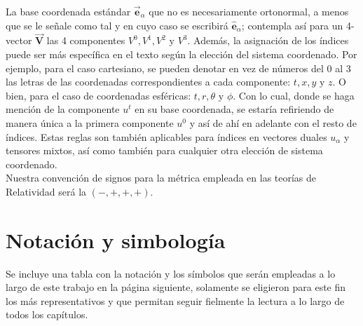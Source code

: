 \documentclass[letterpaper, twoside,openright]{book}
\begin{document}
La base coordenada estándar $\vec{\mathbf{e}}_{\alpha}$ que no es necesariamente ortonormal, a menos que se le señale como tal y en cuyo caso se escribirá $\hat{\mathbf{e}}_{\alpha}$; contempla así para un 4-vector $\vec{\mathbf{V}}$ las 4 componentes $V^0, V^1, V^2\text{ y }V^3$. Además, la asignación de los índices puede ser más específica en el texto según la elección del sistema coordenado. Por ejemplo, para el caso cartesiano, se pueden denotar en vez de números del
0 al 3 las letras de las coordenadas correspondientes a cada componente: $t, x, y\text{ y }z$. O bien, para el caso de coordenadas esféricas: $t, r, \theta\text{ y }\phi$. Con lo cual, donde
se haga mención de la componente $u^t$ en su base coordenada, se estaría refiriendo de manera única a la primera componente $u^0$ y así de ahí en adelante con el resto de índices. Estas reglas son también aplicables para índices en vectores duales $u_{\alpha}$ y tensores mixtos, así como también para cualquier otra elección de sistema coordenado.\\

Nuestra convención de signos para la métrica empleada en las teorías de Relatividad será la $(-,+,+,+)$. 


\section*{Notación y simbología}

Se incluye una tabla con la notación y los símbolos que serán empleadas a lo largo de este trabajo en la página siguiente, solamente se eligieron para este fin los más representativos y que permitan seguir fielmente la lectura a lo largo de todos los capítulos. \\
\end{document}
